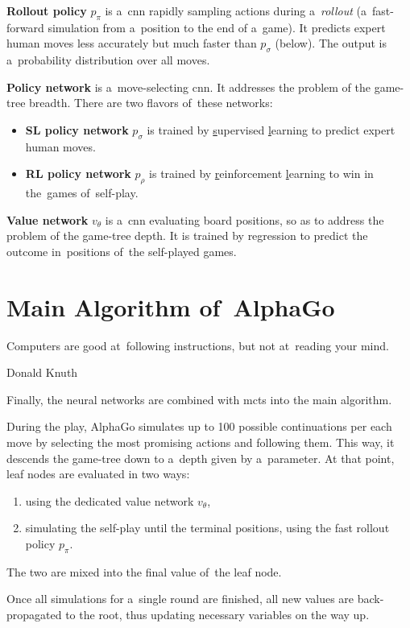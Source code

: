 \textbf{Rollout policy} $p_\pi$ is a~\acrshort{cnn} rapidly sampling actions during a~\emph{rollout} (a~fast-forward simulation from a~position to the end of a~game).
It predicts expert human moves less accurately but much faster than $p_\sigma$ (below).
The output is a~probability distribution over all moves.

\textbf{Policy network} is a~move-selecting \acrshort{cnn}.
It addresses the problem of the game-tree breadth.
There are two flavors of~these networks:
\begin{itemize}
  \item \textbf{SL policy network} $p_\sigma$ is trained by \underline{s}upervised \underline{l}earning to predict expert human moves.
  \item \textbf{RL policy network} $p_\rho$ is trained by \underline{r}einforcement \underline{l}earning to win in the~games of~self-play.
\end{itemize}

\textbf{Value network} $v_\theta$ is a~\acrshort{cnn} evaluating board positions, so as to address the problem of the game-tree depth.
It is trained by regression to predict the outcome in~positions of~the self-played games.

\section{Main Algorithm of~AlphaGo}
\epigraph{
  Computers are good at~following instructions, but not at~reading your mind.
}{Donald Knuth}
Finally, the neural networks are combined with \acrshort{mcts} into the main algorithm.

During the play, AlphaGo simulates up to 100 possible continuations per each move by selecting the most promising actions and following them.
This way, it descends the game-tree down to a~depth given by a~parameter.
At that point, leaf nodes are evaluated in two ways:
\begin{enumerate}[(1)]
  \item using the dedicated value network $v_\theta$,
  \item simulating the self-play until the terminal positions, using the fast rollout policy $p_\pi$.
\end{enumerate}
The two are mixed into the final value of~the leaf node.

Once all simulations for a~single round are finished, all new values are back-propagated to the root, thus updating necessary variables on the way up.

